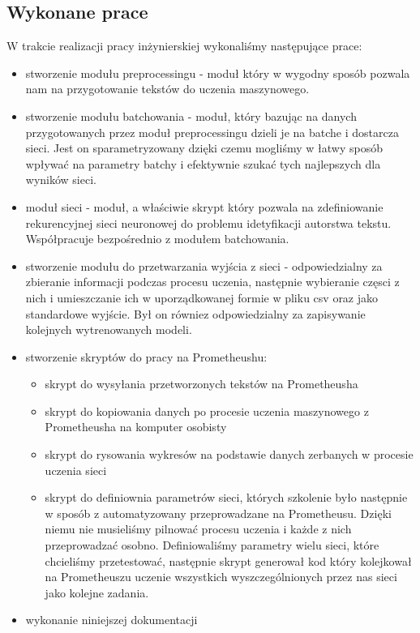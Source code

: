 \subsection{Wykonane prace}
W trakcie realizacji pracy inżynierskiej wykonaliśmy następujące prace:
\begin{itemize}
  \item stworzenie modułu preprocessingu - moduł który w wygodny sposób pozwala nam na przygotowanie tekstów 
  do uczenia maszynowego. 
  \item stworzenie modułu batchowania - moduł, który bazując na danych przygotowanych przez moduł 
  preprocessingu dzieli je na batche i dostarcza sieci. Jest on sparametryzowany dzięki czemu mogliśmy
  w łatwy sposób wpływać na parametry batchy i efektywnie szukać tych najlepszych dla wyników sieci. 
  \item moduł sieci - moduł, a właściwie skrypt który pozwala na zdefiniowanie rekurencyjnej sieci neuronowej
  do problemu idetyfikacji autorstwa tekstu. Współpracuje bezpośrednio z modułem batchowania.
  \item stworzenie modułu do przetwarzania wyjścia z sieci - odpowiedzialny za zbieranie informacji podczas procesu uczenia,
  następnie wybieranie częsci z nich i umieszczanie ich w uporządkowanej formie w pliku csv oraz 
  jako standardowe wyjście. Był on równiez odpowiedzialny za zapisywanie kolejnych wytrenowanych modeli. 
  \item stworzenie skryptów do pracy na Prometheushu:
  \begin{itemize}
    \item skrypt do wysyłania przetworzonych tekstów na Prometheusha 
    \item skrypt do kopiowania danych po procesie uczenia maszynowego z Prometheusha na komputer osobisty
    \item skrypt do rysowania wykresów na podstawie danych zerbanych w procesie uczenia sieci
    \item skrypt do definiownia parametrów sieci, których szkolenie było następnie w sposób z
    automatyzowany przeprowadzane na Prometheusu. Dzięki niemu nie musieliśmy pilnować procesu uczenia i 
   	każde z nich przeprowadzać osobno. Definiowaliśmy parametry wielu sieci, które chcieliśmy przetestować,
   	następnie skrypt generował kod który kolejkował na Prometheuszu uczenie wszystkich wyszczególnionych przez nas sieci 
   	jako kolejne zadania.
  \end{itemize}
  \item wykonanie niniejszej dokumentacji
\end{itemize}



